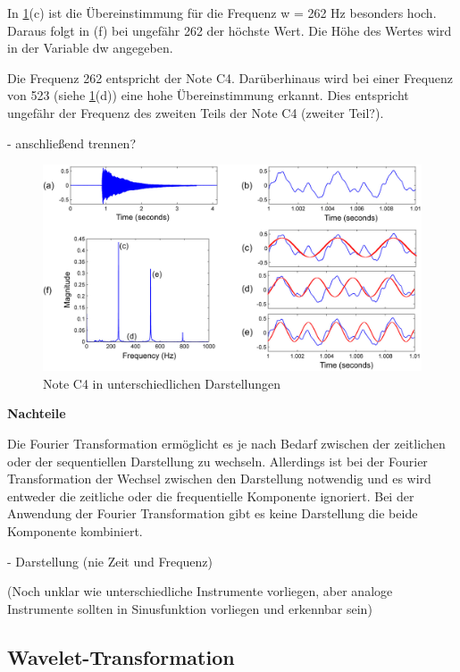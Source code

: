 \par

In \cref{fig:fourier}(c) ist die Übereinstimmung für die Frequenz w = 262 Hz besonders hoch. Daraus folgt in (f) bei ungefähr 262 der höchste Wert. Die Höhe des Wertes wird in der Variable dw angegeben.


\par

Die Frequenz 262 entspricht der Note C4. Darüberhinaus wird bei einer Frequenz von 523 (siehe \cref{fig:fourier}(d)) eine hohe Übereinstimmung erkannt. Dies entspricht ungefähr der Frequenz des zweiten Teils der Note C4 (zweiter Teil?).

%
 - anschließend trennen?
%

%
\begin{figure}
\includegraphics[width=1\textwidth]{images/Fourier_math.PNG}
\caption{Note C4 in unterschiedlichen Darstellungen}
\label{fig:fourier}
\end{figure}
%

%
\textbf{Nachteile}
%
    
Die Fourier Transformation ermöglicht es je nach Bedarf zwischen der zeitlichen oder der sequentiellen Darstellung zu wechseln. Allerdings ist bei der Fourier Transformation der Wechsel zwischen den Darstellung notwendig und es wird entweder die zeitliche oder die frequentielle Komponente ignoriert. Bei der Anwendung der Fourier Transformation gibt es keine Darstellung die beide Komponente kombiniert.

    - Darstellung (nie Zeit und Frequenz)

(Noch unklar wie unterschiedliche Instrumente vorliegen, aber analoge Instrumente sollten in Sinusfunktion vorliegen und erkennbar sein)

%
\subsection{Wavelet-Transformation}
%

